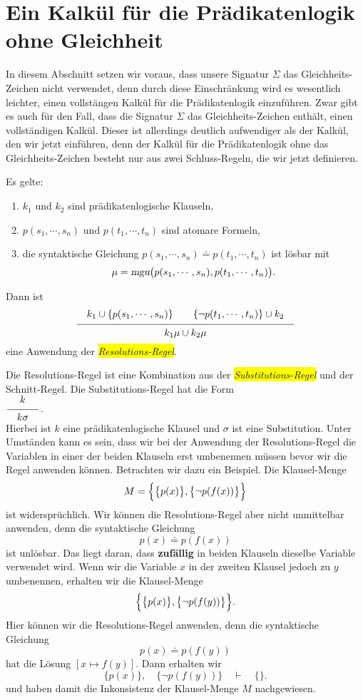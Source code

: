 \section{Ein Kalk\"{u}l f\"{u}r die Pr\"{a}dikatenlogik ohne Gleichheit}
In diesem Abschnitt setzen wir voraus, dass unsere Signatur $\Sigma$ das Gleichheits-Zeichen nicht
verwendet, denn durch diese Einschr\"{a}nkung wird es wesentlich leichter, einen vollst\"{a}ngen Kalk\"{u}l f\"{u}r
die Pr\"{a}dikatenlogik einzuf\"{u}hren.  Zwar gibt es auch f\"{u}r den Fall, dass die Signatur $\Sigma$ das
Gleichheits-Zeichen enth\"{a}lt, einen vollst\"{a}ndigen Kalk\"{u}l.  Dieser ist allerdings deutlich
aufwendiger als der Kalk\"{u}l, den wir jetzt einf\"{u}hren,  denn der Kalk\"{u}l f\"{u}r die Pr\"{a}dikatenlogik ohne
das Gleichheits-Zeichen besteht nur aus zwei Schluss-Regeln, die wir jetzt definieren.
\begin{Definition}[Resolution] 
    Es gelte:
    \begin{enumerate}
    \item $k_1$ und $k_2$ sind pr\"{a}dikatenlogische Klauseln,
    \item $p(s_1,\cdots,s_n)$ und $p(t_1,\cdots,t_n)$ sind atomare Formeln,
    \item die syntaktische Gleichung $p(s_1,\cdots,s_n)  \doteq p(t_1,\cdots,t_n)$ ist l\"{o}sbar mit 
          \[ \mu = \textsl{mgu}\bigl(p(s_1,\cdots,s_n), p(t_1,\cdots,t_n)\bigr). \]
    \end{enumerate}
     Dann ist 
     \[ \schluss{k_1 \cup\{ p(s_1,\cdots,s_n)\} \quad\quad \{\neg p(t_1,\cdots,t_n)\} \cup k_2}{
                 k_1\mu \cup k_2\mu} 
     \]
     eine Anwendung der \colorbox{yellow}{\emph{Resolutions-Regel}}.
     \eox
\end{Definition}
Die Resolutions-Regel ist eine Kombination aus der \colorbox{yellow}{\emph{Substitutions-Regel}} und der 
Schnitt-Regel.  Die Substitutions-Regel hat die Form
\\[0.2cm]
\hspace*{1.3cm}
$\schluss{k}{k\sigma}$. 
\\[0.2cm]
Hierbei ist $k$ eine pr\"{a}dikatenlogische Klausel und $\sigma$ ist eine Substitution.
Unter Umst\"{a}nden kann es sein, dass wir bei der Anwendung der Resolutions-Regel 
die Variablen in einer der beiden Klauseln erst umbenennen
m\"{u}ssen bevor wir die Regel anwenden k\"{o}nnen.  Betrachten wir dazu ein Beispiel.
Die Klausel-Menge 
\[ M = \Bigl\{ \bigl\{ p(x) \bigr\}, \bigl\{ \neg p(f(x)) \bigr\} \Bigr\} \]
ist widerspr\"{u}chlich.  Wir k\"{o}nnen die Resolutions-Regel aber nicht unmittelbar anwenden,
denn die syntaktische Gleichung 
\[ p(x) \doteq p(f(x)) \]
ist unl\"{o}sbar.  Das liegt daran, dass \textbf{zuf\"{a}llig} in beiden Klauseln dieselbe Variable
verwendet wird.  Wenn wir die Variable $x$ in der zweiten Klausel jedoch zu $y$ umbenennen, erhalten
wir die Klausel-Menge 
\[ \Bigl\{ \bigl\{ p(x) \bigr\}, \bigl\{ \neg p(f(y)) \bigr\} \Bigr\}. \]
Hier k\"{o}nnen wir die Resolutions-Regel anwenden, denn die syntaktische Gleichung 
\[ p(x) \doteq p(f(y)) \]
hat die L\"{o}sung $[x \mapsto f(y)]$.  Dann erhalten wir 
\[ \bigl\{ p(x) \bigr\}, \quad \bigl\{ \neg p(f(y)) \bigr\} \quad \vdash \quad \{\}. \]
und haben damit die Inkonsistenz der Klausel-Menge $M$ nachgewiesen.

